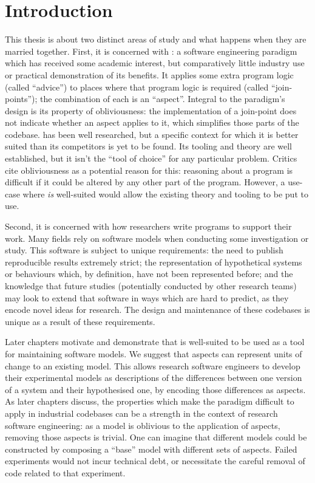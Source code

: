 \chapter{Introduction}

This thesis is about two distinct areas of study and what happens when they are
married together. First, it is concerned with \aop{}: a software engineering
paradigm which has received some academic interest, but comparatively little
industry use or practical demonstration of its benefits. It applies some extra
program logic (called ``advice'') to places where that program logic is required
(called ``join-points''); the combination of each is an ``aspect''. Integral to
the paradigm's design is its property of obliviousness: the implementation of a
join-point does not indicate whether an aspect applies to it, which simplifies
those parts of the codebase. \Aspectorientation has been well researched, but a
specific context for which it is better suited than its competitors is yet to be
found. Its tooling and theory are well established, but it isn't the ``tool of
choice'' for any particular problem. Critics cite obliviousness as a potential
reason for this: reasoning about a program is difficult if it could be altered
by any other part of the program. However, a use-case where \aop{} \emph{is}
well-suited would allow the existing theory and tooling to be put to use.

Second, it is concerned with how researchers write programs to support their
work. Many fields rely on software models when conducting some investigation or
study. This software is subject to unique requirements: the need to publish
reproducible results extremely strict; the representation of hypothetical
systems or behaviours which, by definition, have not been represented before;
and the knowledge that future studies (potentially conducted by other research
teams) may look to extend that software in ways which are hard to predict, as
they encode novel ideas for research.
The design and maintenance of
these codebases is unique as a result of these requirements.

Later chapters motivate and demonstrate that \aop{} is well-suited to be used as
a tool for maintaining software models. We suggest that aspects can represent
units of change to an existing model. This allows research software engineers to
develop their experimental models as descriptions of the differences between one
version of a system and their hypothesised one, by encoding those differences as
aspects. As later chapters discuss, the properties which make the paradigm
difficult to apply in industrial codebases can be a strength in the context of
research software engineering: as a model is oblivious to the application of
aspects, removing those aspects is trivial. One can imagine that different
models could be constructed by composing a ``base'' model with different sets of
aspects. Failed experiments would not incur technical debt, or necessitate the
careful removal of code related to that experiment.

